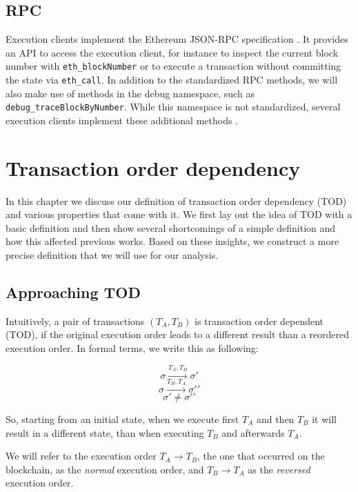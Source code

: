 \documentclass[draft,final]{vutinfth} %
\begin{document}
\section{RPC}

Execution clients implement the Ethereum JSON-RPC specification \cite{noauthor_ethereum_2024}. It provides an API to access the execution client, for instance to inspect the current block number with \verb|eth_blockNumber| or to execute a transaction without committing the state via \verb|eth_call|. In addition to the standardized RPC methods, we will also make use of methods in the debug namespace, such as \verb|debug_traceBlockByNumber|. While this namespace is not standardized, several execution clients implement these additional methods \cite{noauthor_debug_2024}\cite{noauthor_rpc_2024}\cite{noauthor_reth_2024}.


\chapter{Transaction order dependency}

In this chapter we discuss our definition of transaction order dependency (TOD) and various properties that come with it. We first lay out the idea of TOD with a basic definition and then show several shortcomings of a simple definition and how this affected previous works. Based on these insights, we construct a more precise definition that we will use for our analysis.

\section{Approaching TOD}

Intuitively, a pair of transactions $(T_A, T_B)$ is transaction order dependent (TOD), if the original execution order leads to a different result than a reordered execution order. In formal terms, we write this as following:

$$\sigma \xrightarrow{T_A, T_B} \sigma \prime$$
$$\sigma \xrightarrow{T_B, T_A} \sigma \prime \prime$$
$$\sigma \prime \neq \sigma \prime \prime$$

So, starting from an initial state, when we execute first $T_A$ and then $T_B$ it will result in a different state, than when executing $T_B$ and afterwards $T_A$.

We will refer to the execution order $T_A \rightarrow T_B$, the one that occurred on the blockchain, as the \emph{normal} execution order, and $T_B \rightarrow T_A$ as the \emph{reversed} execution order.
\end{document}
